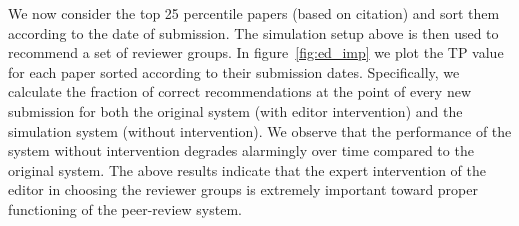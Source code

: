 We now consider the top 25 percentile papers (based on citation) and sort them according to the date of submission. The simulation setup above is then used to recommend a set of reviewer groups. In figure~\ref{fig:ed_imp} we plot the TP value for each paper sorted according to their submission dates. Specifically, we calculate the fraction of correct recommendations at the point of every new submission for both the original system (with editor intervention) and the simulation system (without intervention). We observe that the performance of the system without intervention degrades alarmingly over time compared to the original system. The above results indicate that the expert intervention of the editor in choosing the reviewer groups is extremely important toward proper functioning of the peer-review system. 